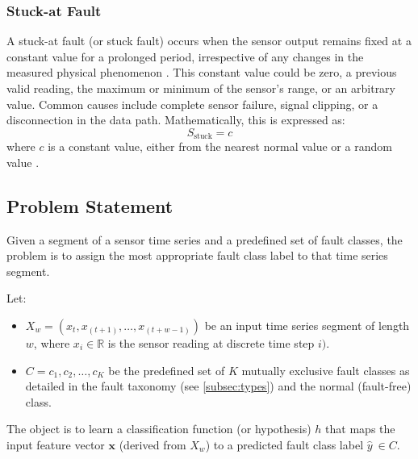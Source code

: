 \subsubsection{Stuck-at Fault}
A stuck-at fault (or stuck fault) occurs when the sensor output remains fixed at a constant value for a prolonged period, irrespective of any changes in the measured physical phenomenon \cite{Saeed2021, Hasan2024, Shi2024}. This constant value could be zero, a previous valid reading, the maximum or minimum of the sensor's range, or an arbitrary value. Common causes include complete sensor failure, signal clipping, or a disconnection in the data path. Mathematically, this is expressed as:
\[S_\text{stuck} = c\]
where \(c\) is a constant value, either from the nearest normal value or a random value \cite{Saeed2021, Hasan2024, Shi2024}.


\subsection{Problem Statement}
Given a segment of a sensor time series and a predefined set of fault classes, the problem is to assign the most appropriate fault class label to that time series segment.

Let:
\begin{itemize}
  \item \(X_w = (x_t, x_(t+1), \ldots, x_(t+w-1))\) be an input time series segment of length \(w\), where \(x_i \in \mathbb{R}\) is the sensor reading at discrete time step \(i)\).
  \item \(C = {c_1, c_2, \ldots, c_K}\) be the predefined set of \(K\) mutually exclusive fault classes as detailed in the fault taxonomy (see \ref{subsec:types}) and the normal (fault-free) class.
\end{itemize}

The object is to learn a classification function (or hypothesis) \(h\) that maps the input feature vector \(\mathbf{x}\) (derived from \(X_w\)) to a predicted fault class label \(\hat{y}\ \in C\).
